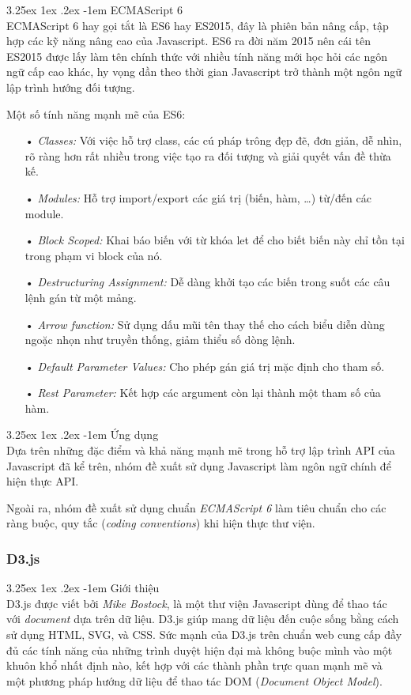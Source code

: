\documentclass[12pt,a4paper,twoside]{article}
\makeatletter
\newcommand{\myparagraph}[1]{\paragraph{#1}\mbox{}\\} %
\renewcommand\paragraph{\@startsection{paragraph}{5}{\z@}%
  {3.25ex \@plus1ex \@minus.2ex}%
  {-1em}%
  {\normalfont\normalsize\bfseries}}
\makeatother
\begin{document}
\myparagraph{ECMAScript 6}
ECMAScript 6 hay gọi tắt là ES6 hay ES2015, đây là phiên bản nâng cấp, tập hợp các kỹ năng nâng cao của Javascript. ES6 ra đời năm 2015 nên cái tên ES2015 được lấy làm tên chính thức với nhiều tính năng mới học hỏi các ngôn ngữ cấp cao khác, hy vọng dần theo thời gian Javascript trở thành một ngôn ngữ lập trình hướng đối tượng.

Một số tính năng mạnh mẽ của ES6:
\begin{itemize}
\item[•] \emph{Classes:} Với việc hỗ trợ class, các cú pháp trông đẹp đẽ, đơn giản, dễ nhìn, rõ ràng hơn rất nhiều  trong việc tạo ra đối tượng và giải quyết vấn đề thừa kế.
\item[•] \emph{Modules:} Hỗ trợ import/export các giá trị (biến, hàm, …) từ/đến các module.
\item[•] \emph{Block Scoped:} Khai báo biến với từ khóa let để cho biết biến này chỉ tồn tại trong phạm vi block của nó.
\item[•] \emph{Destructuring Assignment:} Dễ dàng khởi tạo các biến trong suốt các câu lệnh gán từ một mảng.
\item[•] \emph{Arrow function:} Sử dụng dấu mũi tên thay thế cho cách biểu diễn dùng ngoặc nhọn như truyền thống, giảm thiểu số dòng lệnh.
\item[•] \emph{Default Parameter Values:} Cho phép gán giá trị mặc định cho tham số.
\item[•] \emph{Rest Parameter:} Kết hợp các argument còn lại thành một tham số của hàm.
\end{itemize}

\myparagraph{Ứng dụng}
Dựa trên những đặc điểm và khả năng mạnh mẽ trong hỗ trợ lập trình API của Javascript đã kể trên, nhóm đề xuất sử dụng Javascript làm ngôn ngữ chính để hiện thực API.

Ngoài ra, nhóm đề xuất sử dụng chuẩn \textit{ECMAScript 6} làm tiêu chuẩn cho các ràng buộc, quy tắc (\textit{coding conventions}) khi hiện thực thư viện.
\subsubsection{D3.js}
\myparagraph{Giới thiệu}
D3.js được viết bởi \textit{Mike Bostock}, là một thư viện Javascript dùng để thao tác với \textit{document} dựa trên dữ liệu. D3.js giúp mang dữ liệu đến cuộc sống bằng cách sử dụng HTML, SVG, và CSS. Sức mạnh của D3.js trên chuẩn web cung cấp đầy đủ các tính năng của những trình duyệt hiện đại mà không buộc mình vào một khuôn khổ nhất định nào, kết hợp với các thành phần trực quan mạnh mẽ và một phương pháp hướng dữ liệu để thao tác DOM (\textit{Document Object Model}).
\end{document}
